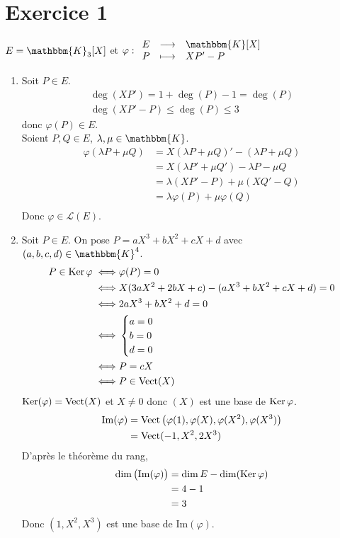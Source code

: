 \part{Exercice 1}

$E = \mathbbm{K}_3[X]$ et $\varphi : \begin{array}{rcl}
	E &\longrightarrow& \mathbbm{K}[X] \\
	P &\longmapsto& XP' - P
\end{array}$\\

\begin{enumerate}
	\item Soit $P \in E$.
		\begin{align*}
			\deg(XP') = 1 + \deg(P) - 1 = \deg(P)\\
			\deg(XP'-P) \le \deg(P) \le 3
		\end{align*}
		donc $\varphi(P) \in E$.\\
		Soient $P,Q \in E$, $\lambda, \mu \in \mathbbm{K}$.
		\begin{align*}
			\varphi(\lambda P + \mu Q) &= X(\lambda P + \mu Q)' - (\lambda P + \mu Q) \\
			&= X(\lambda P' + \mu Q') - \lambda P - \mu Q \\
			&= \lambda (XP' - P) + \mu(XQ' - Q) \\
			&= \lambda \varphi(P) + \mu \varphi(Q) \\
		\end{align*}
		Donc $\varphi \in \mathcal{L}(E)$.
	\item Soit $P \in E$. On pose $P = aX^3+bX^2+cX+d$ avec $(a,b,c,d) \in \mathbbm{K}^4$.
		\begin{align*}
			P \in \operatorname{Ker}\varphi \iff& \varphi(P) = 0\\
			\iff& X(3aX^2+2bX+c) - (aX^3 + bX^2+cX+d) = 0\\
			\iff& 2aX^3 + bX^2 + d = 0\\
			\iff& \begin{cases}
				a = 0\\
				b = 0\\
				d = 0
			\end{cases}\\
			\iff& P = cX\\
			\iff& P \in \operatorname{Vect}(X)
		\end{align*}
		$\operatorname{Ker}(\varphi) = \operatorname{Vect}(X)$ et $X \neq 0$ donc $(X)$ est une base de $\operatorname{Ker}\varphi$.
		\begin{align*}
			\mathrm{Im}(\varphi) &= \operatorname{Vect}\big(\varphi(1), \varphi(X), \varphi(X^2), \varphi(X^3)\big)\\
			&= \operatorname{Vect}(-1, X^2, 2X^3) \\
		\end{align*}
		D'après le théorème du rang,
		\begin{align*}
			\dim\big(\mathrm{Im}(\varphi)\big) &= \dim E - \dim(\operatorname{Ker} \varphi) \\
			&= 4 - 1 \\
			&= 3 \\
		\end{align*}
		Donc $(1, X^2, X^3)$ est une base de $\mathrm{Im}(\varphi)$.
\end{enumerate}

